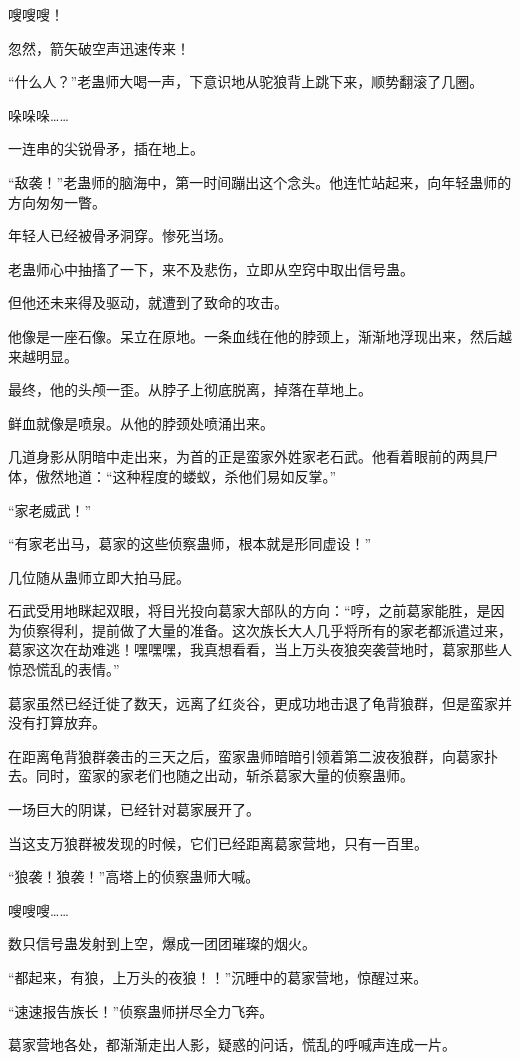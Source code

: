 \begin{this_body}
嗖嗖嗖！

忽然，箭矢破空声迅速传来！

“什么人？”老蛊师大喝一声，下意识地从驼狼背上跳下来，顺势翻滚了几圈。

哚哚哚……

一连串的尖锐骨矛，插在地上。

“敌袭！”老蛊师的脑海中，第一时间蹦出这个念头。他连忙站起来，向年轻蛊师的方向匆匆一瞥。

年轻人已经被骨矛洞穿。惨死当场。

老蛊师心中抽搐了一下，来不及悲伤，立即从空窍中取出信号蛊。

但他还未来得及驱动，就遭到了致命的攻击。

他像是一座石像。呆立在原地。一条血线在他的脖颈上，渐渐地浮现出来，然后越来越明显。

最终，他的头颅一歪。从脖子上彻底脱离，掉落在草地上。

鲜血就像是喷泉。从他的脖颈处喷涌出来。

几道身影从阴暗中走出来，为首的正是蛮家外姓家老石武。他看着眼前的两具尸体，傲然地道：“这种程度的蝼蚁，杀他们易如反掌。”

“家老威武！”

“有家老出马，葛家的这些侦察蛊师，根本就是形同虚设！”

几位随从蛊师立即大拍马屁。

石武受用地眯起双眼，将目光投向葛家大部队的方向：“哼，之前葛家能胜，是因为侦察得利，提前做了大量的准备。这次族长大人几乎将所有的家老都派遣过来，葛家这次在劫难逃！嘿嘿嘿，我真想看看，当上万头夜狼突袭营地时，葛家那些人惊恐慌乱的表情。”

葛家虽然已经迁徙了数天，远离了红炎谷，更成功地击退了龟背狼群，但是蛮家并没有打算放弃。

在距离龟背狼群袭击的三天之后，蛮家蛊师暗暗引领着第二波夜狼群，向葛家扑去。同时，蛮家的家老们也随之出动，斩杀葛家大量的侦察蛊师。

一场巨大的阴谋，已经针对葛家展开了。

当这支万狼群被发现的时候，它们已经距离葛家营地，只有一百里。

“狼袭！狼袭！”高塔上的侦察蛊师大喊。

嗖嗖嗖……

数只信号蛊发射到上空，爆成一团团璀璨的烟火。

“都起来，有狼，上万头的夜狼！！”沉睡中的葛家营地，惊醒过来。

“速速报告族长！”侦察蛊师拼尽全力飞奔。

葛家营地各处，都渐渐走出人影，疑惑的问话，慌乱的呼喊声连成一片。


\end{this_body}
